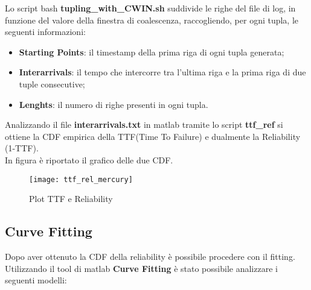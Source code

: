 Lo script bash \textbf{tupling\_with\_CWIN.sh} suddivide le righe del file di log,
in funzione del valore della finestra di coalescenza, raccogliendo, per ogni tupla,
le seguenti informazioni:

\begin{itemize}
  \item \textbf{Starting Points}: il timestamp della prima riga di ogni tupla generata;
  \item \textbf{Interarrivals}: il tempo che intercorre tra l'ultima riga e la
  prima riga di due tuple consecutive;
  \item \textbf{Lenghts}: il numero di righe presenti in ogni tupla.
\end{itemize}

Analizzando il file \textbf{interarrivals.txt} in matlab tramite lo script \textbf{ttf\_ref}
si ottiene la CDF empirica della TTF(Time To Failure) e dualmente la Reliability (1-TTF).\\
In figura è riportato il grafico delle due CDF.

\clearpage

\begin{figure}[!htbp]
  \centering
  \texttt{[image: ttf\_rel\_mercury]}
  \caption{Plot TTF e Reliability}
  \label{ffda_ttf_rel_mercury}
\end{figure}

\subsection{Curve Fitting}

Dopo aver ottenuto la CDF della reliability è possibile procedere con il fitting.\\
Utilizzando il tool di matlab \textbf{Curve Fitting} è stato possibile
analizzare i seguenti modelli:

\clearpage

